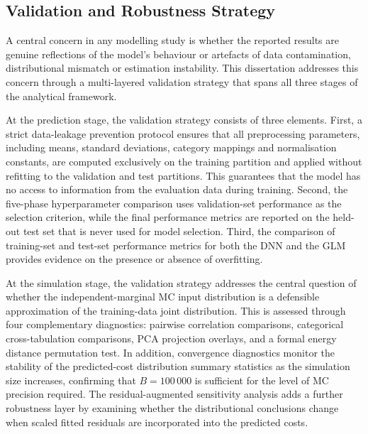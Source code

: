 
\subsection{Validation and Robustness Strategy}
\label{sec:validation_strategy}

A central concern in any modelling study is whether the reported results
are genuine reflections of the model's behaviour or artefacts of data
contamination, distributional mismatch or estimation instability.  This
dissertation addresses this concern through a multi-layered validation
strategy that spans all three stages of the analytical framework.

At the prediction stage, the validation strategy consists of three
elements.  First, a strict data-leakage prevention protocol ensures that
all preprocessing parameters, including means, standard deviations,
category mappings and normalisation constants, are computed exclusively
on the training partition and applied without refitting to the validation
and test partitions.  This guarantees that the model has no access to
information from the evaluation data during training.  Second, the
five-phase hyperparameter comparison uses validation-set performance as
the selection criterion, while the final performance metrics are reported
on the held-out test set that is never used for model selection.  Third,
the comparison of training-set and test-set performance metrics for both
the DNN and the GLM provides evidence on the presence or absence of
overfitting.

At the simulation stage, the validation strategy addresses the central
question of whether the independent-marginal MC input
distribution is a defensible approximation of the training-data joint
distribution.  This is assessed through four complementary diagnostics:
pairwise correlation comparisons, categorical cross-tabulation
comparisons, PCA projection overlays, and a formal energy distance
permutation test.  In addition, convergence diagnostics monitor the
stability of the predicted-cost distribution summary statistics as the
simulation size increases, confirming that $B = 100\,000$ is sufficient
for the level of MC precision required.  The
residual-augmented sensitivity analysis adds a further robustness layer
by examining whether the distributional conclusions change when scaled
fitted residuals are incorporated into the predicted costs.

